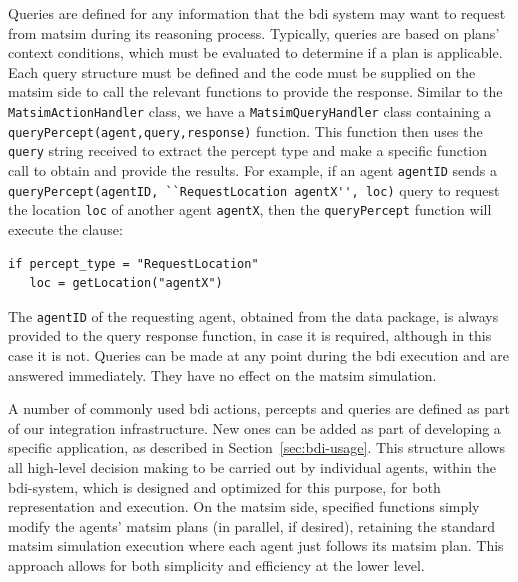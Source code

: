 Queries are defined for any information that the \gls{bdi} system may want
to request from \gls{matsim} during its reasoning process. Typically, queries
are based on plans' context conditions, which must be evaluated
to determine if a plan is applicable. Each query structure must be
defined and the code must be supplied on the \gls{matsim} side to call the
relevant functions to provide the response. 
Similar to the \lstinline{MatsimActionHandler} class, we have a
\lstinline{MatsimQueryHandler} 
class containing a \lstinline{queryPercept(agent,query,response)}
function.
This function then uses the \lstinline{query} string received to extract the
percept type and make a specific function call to obtain and provide the
results. For example, if an agent \lstinline{agentID} sends a
\lstinline{queryPercept(agentID, ``RequestLocation agentX'', loc)} query to
request the location \lstinline{loc} of another agent \lstinline{agentX}, then the
\lstinline{queryPercept} 
function will execute the clause:
\begin{lstlisting}
if percept_type = "RequestLocation"
   loc = getLocation("agentX")
\end{lstlisting}
The \lstinline{agentID} of
the requesting agent, obtained from the data package, is always
provided to the query response function, in case it is required, 
although in this case it is not.
Queries can be made at any point
during the \gls{bdi} execution and are answered immediately. They 
have no effect on the \gls{matsim} simulation.

A number of commonly used \gls{bdi} actions, percepts and queries are
defined as part of our integration infrastructure. New ones can be
added as part of developing a specific application, as described in
Section~\ref{sec:bdi-usage}.
%
This structure allows all high-level decision making to be carried out by 
individual agents, within the \gls{bdi}-system, which is designed and
optimized for this purpose, for both representation and
execution. On the \gls{matsim} side, specified functions simply modify the
agents' \gls{matsim} plans (in parallel, if desired), retaining the standard
\gls{matsim} simulation execution where each agent just follows its \gls{matsim}
plan.  This approach allows for both simplicity and efficiency at the
lower level.

